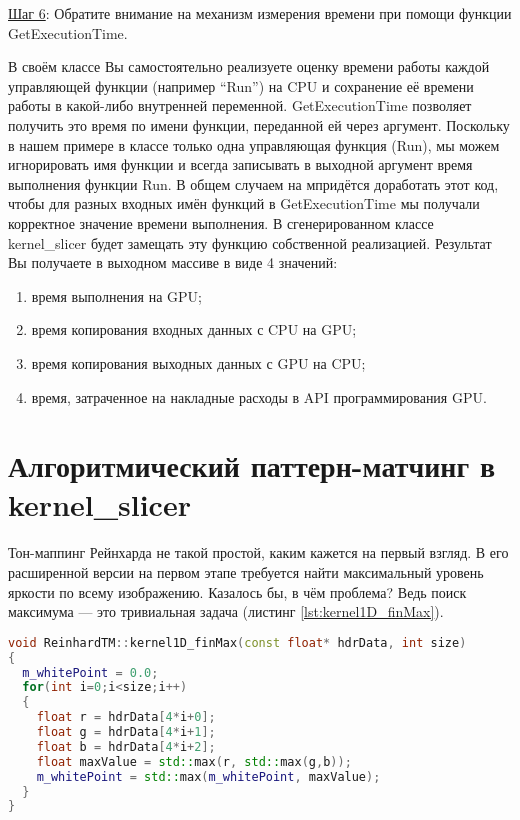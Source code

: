 \documentclass[11pt,fleqn,english,russian]{report} %
\begin{document}
\vspace*{5px}
\noindent\underline{Шаг 6}: Обратите внимание на механизм измерения времени при помощи функции GetExecutionTime. 

В своём классе Вы самостоятельно реализуете оценку времени работы каждой управляющей функции (например ``Run'') на CPU и сохранение её времени работы в какой-либо внутренней переменной. GetExecutionTime позволяет получить это время по имени функции, переданной ей через аргумент. Поскольку в нашем примере в классе только одна управляющая функция (Run), мы можем игнорировать имя функции и всегда записывать в выходной аргумент время выполнения функции Run. В общем случаем на мпридётся доработать этот код, чтобы для разных входных имён функций в GetExecutionTime мы получали корректное значение времени выполнения. В сгенерированном классе kernel\_slicer будет замещать эту функцию собственной реализацией. Результат Вы получаете в выходном массиве в виде 4 значений: 

\begin{enumerate}
\item время выполнения на GPU;
\item время копирования входных данных с CPU на GPU;
\item время копирования выходных данных с GPU на CPU;
\item время, затраченное на накладные расходы в API программирования GPU.
\end{enumerate}

\section{Алгоритмический паттерн-матчинг в kernel\_slicer}

Тон-маппинг Рейнхарда не такой простой, каким кажется на первый взгляд. В его расширенной версии на первом этапе требуется найти максимальный уровень яркости по всему изображению. Казалось бы, в чём проблема? Ведь поиск максимума --- это тривиальная задача (листинг \ref{lst:kernel1D_finMax}).

\begin{lstlisting}[language=C++, 
  	               caption=вычислительное ядро поиска максимума с алгоритмическим паттерном редукции, 
	               label=lst:kernel1D_finMax]	
void ReinhardTM::kernel1D_finMax(const float* hdrData, int size)
{
  m_whitePoint = 0.0;
  for(int i=0;i<size;i++)
  {
    float r = hdrData[4*i+0];
    float g = hdrData[4*i+1];
    float b = hdrData[4*i+2];
    float maxValue = std::max(r, std::max(g,b));
    m_whitePoint = std::max(m_whitePoint, maxValue);
  }  
}
\end{lstlisting}
\end{document}

